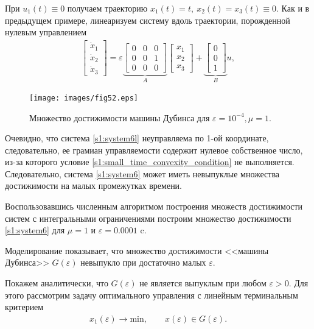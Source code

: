 \documentclass[../main.tex]{subfiles}
\begin{document}
При $ u_1(t) \equiv 0 $ получаем траекторию $ x_1(t) = t, \ x_2(t) = x_3(t) \equiv 0 $.
Как и в предыдущем примере, линеаризуем систему вдоль траектории, порожденной нулевым управлением
\begin{gather}\label{s1:system6l}
 \begin{bmatrix}
 \dot{x}_1\\
 \dot{x}_2\\
 \dot{x}_3
 \end{bmatrix}
 = 
 \varepsilon \underbrace {\begin{bmatrix}
 0&0&0\\
 0&0&1\\
 0&0&0
 \end{bmatrix}}_A
 \begin{bmatrix}
 x_1\\
 x_2 \\
 x_3
 \end{bmatrix}
 + 
 \underbrace {\begin{bmatrix}
 0\\
 0\\
 1
 \end{bmatrix}}_B u,
\end{gather}
\begin{figure}[h]
 \centering
 \texttt{[image: images/fig52.eps]}
 \caption{Множество достижимости машины Дубинса для $\varepsilon = 10^{-4}, \mu = 1$.}
\end{figure}
Очевидно, что система \eqref{s1:system6l} неуправляема по 1-ой координате, следовательно, ее грамиан управляемости содержит нулевое собственное число, из-за которого условие \eqref{s1:small_time_convexity_condition} не выполняется.
Следовательно, система \eqref{s1:system6} может иметь невыпуклые множества достижимости на малых промежутках времени.
 
Воспользовавшись численным алгоритмом построения множеств достижимости систем с интегральными ограничениями \cite{GusevZykov2018} построим множество достижимости \eqref{s1:system6} для $ \mu = 1 $ и $ \varepsilon = 0.0001 $ c. 
 
Моделирование показывает, что множество достижимости <<машины Дубинса>> $G(\varepsilon)$ невыпукло при достаточно малых $ \varepsilon $.

Покажем аналитически, что $G(\varepsilon)$ не является выпуклым при любом $\varepsilon >0$.
Для этого рассмотрим задачу оптимального управления с линейным терминальным критерием
\begin{gather}\label{s1:opt_problem}
	x_1(\varepsilon) \rightarrow \mathrm{min}, \qquad
	x(\varepsilon) \in G(\varepsilon).
\end{gather}
\end{document}
